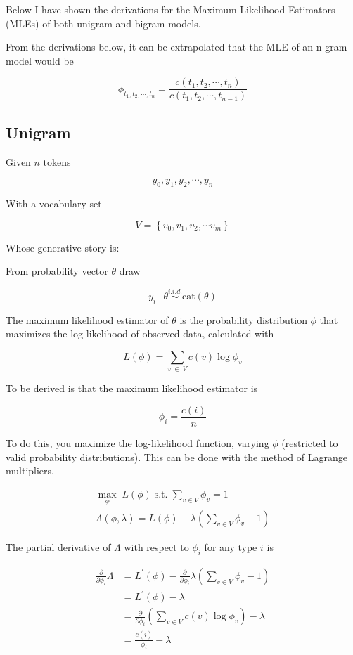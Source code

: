 \documentclass[11pt]{article}
\begin{document}
Below I have shown the derivations for the Maximum Likelihood Estimators (MLEs) of both unigram and bigram models.

From the derivations below, it can be extrapolated that the MLE of an n-gram model would be

$$\phi_{t_1, t_2, \cdots , t_n} = \frac{c \left( t_1, t_2, \cdots , t_n \right)}{c \left( t_1, t_2, \cdots , t_{n - 1} \right)}$$

\subsection{Unigram}
Given $n$ tokens

$$ y_0, y_1, y_2, \cdots, y_n $$

With a vocabulary set 

$$ V = \left\{ v_0, v_1, v_2, \cdots v_m \right\} $$

Whose generative story is:

From probability vector $\theta$ draw

$$ y_i \: \lvert \: \theta \stackrel{i.i.d.}{\sim} \text{cat} \left( \theta \right) $$

The maximum likelihood estimator of $\theta$ is the probability distribution $\phi$ that maximizes the log-likelihood of observed data, calculated with

$$ L \left( \phi \right) = \sum \limits_{v \: \in \: V} c \left( v \right) \log{\phi_v} $$

To be derived is that the maximum likelihood estimator is

$$\phi_i = \frac{c \left( i \right)}{n}$$

To do this, you maximize the log-likelihood function, varying $\phi$ (restricted to valid probability distributions). This can be done with the method of Lagrange multipliers.

\begin{align*}
\max \limits_{\phi} \; L\left( \phi \right) \; \text{s.t.} \; \sum \limits_{v \in V} \phi_{v} = 1 \\
%
\Lambda \left( \phi, \lambda \right) = L\left( \phi \right) - \lambda \left( \sum \limits_{v \in V} \phi_{v} - 1 \right)
\end{align*}

The partial derivative of $\Lambda$ with respect to $\phi_i$ for any type $i$ is

\begin{align*}
%
\frac{\partial}{\partial \phi_i} \Lambda &= L^\prime \left( \phi \right) - \frac{\partial}{\partial \phi_i} \lambda \left( \sum \limits_{v \in V} \phi_{v} - 1 \right) \\
%
&= L^\prime \left( \phi \right) - \lambda \\
%
&= \frac{\partial}{\partial \phi_i} \left( \sum \limits_{v \in V} c \! \left( v \right) \log{\phi_v} \right) - \lambda \\
%
&= \frac{c \left( i \right)}{\phi_i} - \lambda
\end{align*}
\end{document}
